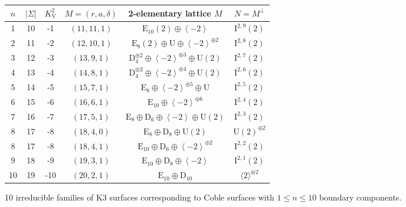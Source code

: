 \documentclass{amsart}
\begin{document}
\begin{remark}
\begin{figure}[H]
\centering
\begin{tabular}{|c|c|c|c|c|c|}
\hline$n$ & ${\left\lvert {\Sigma} \right\rvert}$ & $K_{\mathrm{V}}^{2}$ & $M = (r, a, \delta)$ & 2-elementary lattice $M$ & $N=M^{\perp}$ \\
\hline 1 & 10 & -1 & $(11,11,1)$ & $\mathrm{E}_{10}(2) \oplus \left\langle{-2}\right\rangle$ & $\mathrm{I}^{2,9}(2)$ \\
2 & 11 & -2 & $(12,10,1)$ & $\mathrm{E}_{8}(2) \oplus \mathrm{U} \oplus \left\langle{-2}\right\rangle^{\oplus 2}$ & $\mathrm{I}^{2,8}(2)$ \\
3 & 12 & -3 & $(13,9,1)$ & $\mathrm{D}_{4}^{\oplus 2} \oplus \left\langle{-2}\right\rangle^{\oplus 3} \oplus \mathrm{U}(2)$ & $\mathrm{I}^{2,7}(2)$ \\
4 & 13 & -4 & $(14,8,1)$ & $\mathrm{D}_{4}^{\oplus 2} \oplus \left\langle{-2}\right\rangle^{\oplus 4} \oplus \mathrm{U}(2)$ & $\mathrm{I}^{2,6}(2)$ \\
5 & 14 & -5 & $(15,7,1)$ & $\mathrm{E}_{8} \oplus \left\langle{-2}\right\rangle^{\oplus 5} \oplus \mathrm{U}$ & $\mathrm{I}^{2,5}(2)$ \\
6 & 15 & -6 & $(16,6,1)$ & $\mathrm{E}_{10} \oplus \left\langle{-2}\right\rangle^{\oplus 6}$ & $\mathrm{I}^{2,4}(2)$ \\
7 & 16 & -7 & $(17,5,1)$ & $\mathrm{E}_{8} \oplus \mathrm{D}_{6} \oplus \left\langle{-2}\right\rangle \oplus \mathrm{U}(2)$ & $\mathrm{I}^{2,3}(2)$ \\
8 & 17 & -8 & $(18,4,0)$ & $\mathrm{E}_{8} \oplus \mathrm{D}_{8} \oplus \mathrm{U}(2)$ & $\mathrm{U}(2)^{\oplus 2}$ \\
8 & 17 & -8 & $(18,4,1)$ & $\mathrm{E}_{10} \oplus \mathrm{D}_{6} \oplus \left\langle{-2}\right\rangle^{\oplus 2}$ & $\mathrm{I}^{2,2}(2)$ \\
9 & 18 & -9 & $(19,3,1)$ & $\mathrm{E}_{10} \oplus \mathrm{D}_{8} \oplus \left\langle{-2}\right\rangle$ & $\mathrm{I}^{2,1}(2)$ \\
10 & 19 & -10 & $(20,2,1)$ & $\mathrm{E}_{10} \oplus \mathrm{D}_{10}$ & $\langle 2\rangle^{\oplus 2}$ \\
\hline
\end{tabular}
\caption{10 irreducible families of K3 surfaces corresponding to Coble surfaces with $1\leq n\leq 10$ boundary components.}
\label{fig:coble-boundary-components-table}
\end{figure}

\end{remark}
\end{document}

